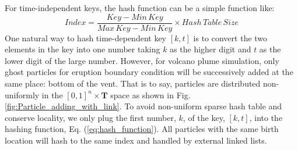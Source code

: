 \documentclass[procedia]{easychair}
\begin{document}
For time-independent keys, the hash function can be a simple function like:
\begin{equation}
Index= \frac{Key - Min\,Key}{Max\,Key - Min\,Key} 
\times Hash\,Table\,Size 
\label{eq:hash_function}
\end{equation}
One natural way to hash time-dependent key $[k,t]$ is to convert the two elements in the key into one number taking $k$ as the higher digit and $t$ as the lower digit of the large number. However, for volcano plume simulation, only ghost particles for eruption boundary condition will be successively added at the same place: bottom of the vent. That is to say, particles are distributed non-uniformly in the $[0,1]^n \times \textbf{T}$ space as shown in Fig. \ref{fig:Particle_adding_with_link}. To avoid non-uniform sparse hash table and conserve locality, we only plug the first number, $k$, of the key, $[k,t]$, into the hashing function, Eq. (\ref{eq:hash_function}). All particles with the same birth location will hash to the same index and handled by external linked lists.
\end{document}
